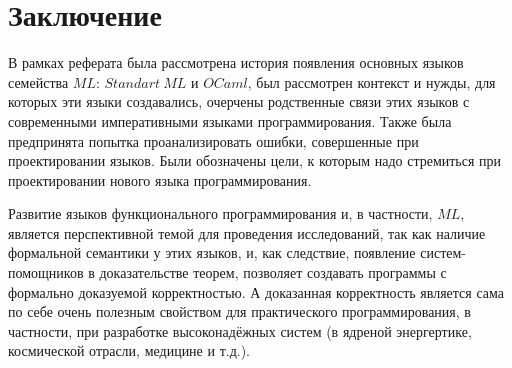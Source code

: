 \documentclass[14pt]{matmex-diploma-custom}
\begin{document}
\section{Заключение}
В рамках реферата была рассмотрена история появления основных языков семейства $M\!L$: $Standart\ M\!L$ и $OCaml$, был рассмотрен контекст и нужды, для которых эти языки создавались, очерчены родственные связи этих языков с современными императивными языками программирования. Также была предпринята попытка проанализировать ошибки, совершенные при проектировании языков. Были обозначены цели, к которым надо стремиться при проектировании нового языка программирования.

Развитие языков функционального программирования и, в частности, $M\!L$, является перспективной темой для проведения исследований, так как наличие формальной семантики у этих языков, и, как следствие, появление систем-помощников в доказательстве теорем, позволяет создавать программы с формально доказуемой корректностью. А доказанная корректность является сама по себе очень полезным свойством для практического программирования, в частности, при разработке высоконадёжных систем (в ядреной энергертике, космической отрасли, медицине и т.д.).

\newpage
\end{document}
